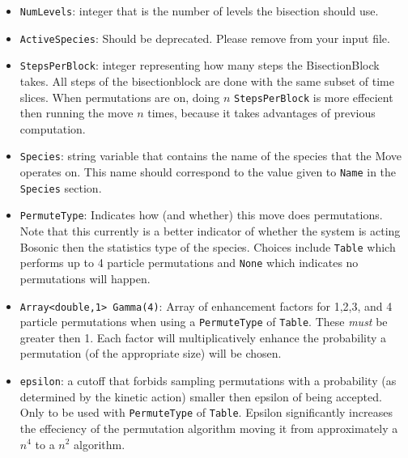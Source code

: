 \documentclass{book}
\begin{document}
\begin{itemize}

  \item \texttt{NumLevels}: integer that is the number of levels the
  bisection should use.
   
  \item \texttt{ActiveSpecies}: Should be deprecated. Please remove
  from your input file. 

  \item \texttt{StepsPerBlock}: integer representing how many steps
  the BisectionBlock takes.  All steps of the bisectionblock are done
  with the same subset of time slices.  When permutations are on, doing $n$
  \texttt{StepsPerBlock} is more effecient then running the move $n$
  times, because it takes advantages of previous computation.  

  
   \item \texttt{Species}: string variable that contains the name of
   the species that the Move operates on.  This name should correspond
   to the value given to \texttt{Name} in the \texttt{Species}
   section.


   \item \texttt{PermuteType}: Indicates how (and whether) this move
   does permutations.  Note that this currently is a better indicator
   of whether the system is acting Bosonic then the statistics type of
   the species.  Choices include \texttt{Table} which performs up to 4
   particle permutations and \texttt{None} which indicates no
   permutations will happen.

   \item \texttt{Array<double,1> Gamma(4)}: Array of enhancement
     factors for 1,2,3, and 4 particle
     permutations when using a \texttt{PermuteType} of \texttt{Table}.
     These {\em must} be greater then 1.  Each factor will
     multiplicatively enhance the
     probability a permutation (of the appropriate size) will be chosen.
     
   \item \texttt{epsilon}: a cutoff that forbids sampling permutations with
     a probability (as determined by the kinetic action) smaller then epsilon 
     of being accepted.  Only to be used with \texttt{PermuteType} of
     \texttt{Table}. Epsilon significantly increases the 
     effeciency of the permutation algorithm moving it from
     approximately a $n^4$ to a $n^2$ algorithm. 

\end{itemize}
\end{document}
